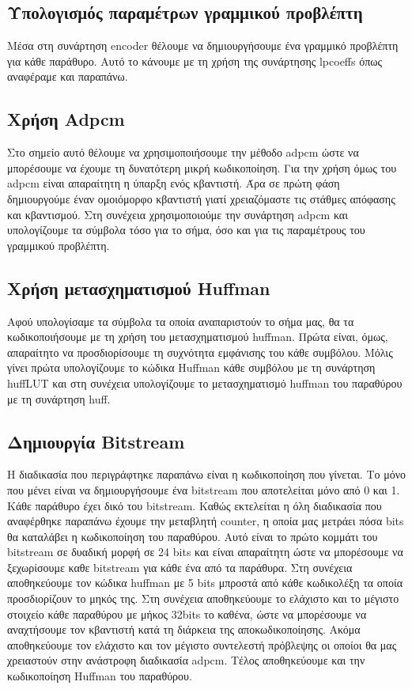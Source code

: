 \subsection{Υπολογισμός παραμέτρων γραμμικού προβλέπτη}
\par Μέσα στη συνάρτηση encoder θέλουμε να δημιουργήσουμε ένα γραμμικό προβλέπτη για 
κάθε παράθυρο. Αυτό το κάνουμε με τη χρήση της συνάρτησης lpcoeffs όπως αναφέραμε και 
παραπάνω.

\subsection{Χρήση Adpcm}
\par Στο σημείο αυτό θέλουμε να χρησιμοποιήσουμε την μέθοδο adpcm ώστε να μπορέσουμε 
να έχουμε τη δυνατότερη μικρή κωδικοποίηση. Για την χρήση όμως του adpcm είναι 
απαραίτητη η ύπαρξη ενός κβαντιστή. Άρα σε πρώτη φάση δημιουργούμε έναν ομοιόμορφο 
κβαντιστή γιατί χρειαζόμαστε τις στάθμες απόφασης και κβαντισμού. Στη συνέχεια 
χρησιμοποιούμε την συνάρτηση adpcm και υπολογίζουμε τα σύμβολα τόσο για το σήμα, 
όσο και για τις παραμέτρους του γραμμικού προβλέπτη.

\subsection{Χρήση μετασχηματισμού Huffman}
\par Αφού υπολογίσαμε τα σύμβολα τα οποία αναπαριστούν το σήμα μας, θα τα 
κωδικοποιήσουμε με τη χρήση του μετασχηματισμού huffman. Πρώτα είναι, όμως, 
απαραίτητο να προσδιορίσουμε τη συχνότητα εμφάνισης του κάθε συμβόλου. Μόλις 
γίνει πρώτα υπολογίζουμε το κώδικα Huffman κάθε συμβόλου με τη συνάρτηση huffLUT 
και στη συνέχεια υπολογίζουμε το μετασχηματισμό huffman του παραθύρου με τη συνάρτηση 
huff.

\subsection{Δημιουργία Bitstream}
\par Η διαδικασία που περιγράφτηκε παραπάνω είναι η κωδικοποίηση που γίνεται. Το 
μόνο που μένει είναι να δημιουργήσουμε ένα bitstream που αποτελείται μόνο από 0 
και 1. Κάθε παράθυρο έχει δικό του bitstream. Καθώς εκτελείται η όλη διαδικασία 
που αναφέρθηκε παραπάνω έχουμε την μεταβλητή counter, η οποία μας μετράει πόσα 
bits θα καταλάβει η κωδικοποίηση του παραθύρου. Αυτό είναι το πρώτο κομμάτι του bitstream 
σε δυαδική μορφή σε 24 bits και είναι απαραίτητη ώστε να μπορέσουμε να ξεχωρίσουμε 
καθε bitstream για κάθε ένα από τα παράθυρα. Στη συνέχεια αποθηκεύουμε τον κώδικα huffman 
με 5 bits μπροστά από κάθε κωδικολέξη τα οποία προσδιορίζουν το μηκός της. Στη συνέχεια 
αποθηκεύουμε το ελάχιστο και το μέγιστο στοιχείο κάθε παραθύρου με μήκος 32bits το καθένα, ώστε να 
μπορέσουμε να αναχτήσουμε τον κβαντιστή κατά τη διάρκεια της αποκωδικοποίησης. Ακόμα 
αποθηκεύουμε τον ελάχιστο και τον μέγιστο συντελεστή πρόβλεψης οι οποίοι θα μας χρειαστούν 
στην ανάστροφη διαδικασία adpcm. Τέλος αποθηκεύουμε και την κωδικοποίηση Huffman του 
παραθύρου.


